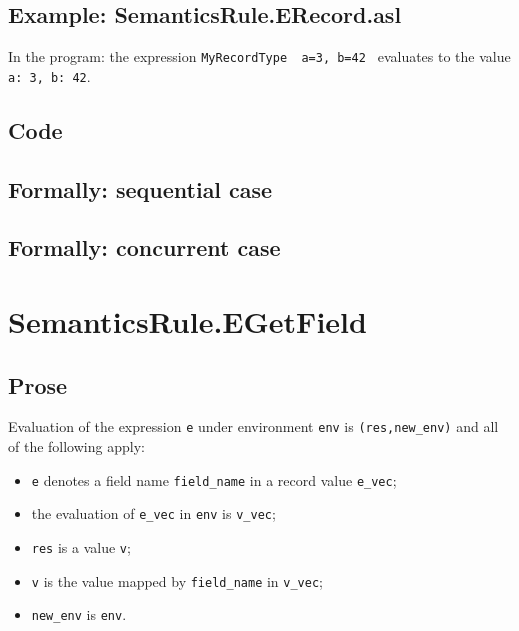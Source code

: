 \documentclass{book}
\begin{document}
  \subsection{Example: SemanticsRule.ERecord.asl}
    In the program:
    the expression \texttt{MyRecordType { a=3, b=42 }} evaluates to the value \texttt{{a:
3, b: 42}}.

  \subsection{Code}

\begin{emptyformal}
  \subsection{Formally: sequential case}

  \subsection{Formally: concurrent case}
\end{emptyformal}


\section{SemanticsRule.EGetField \label{sec:SemanticsRule.EGetField}}

  \subsection{Prose}
  Evaluation of the expression \texttt{e} under environment \texttt{env} is
  \texttt{(res,new\_env)} and all of the following apply:
  \begin{itemize}
  \item \texttt{e} denotes a field name \texttt{field\_name} in a record value \texttt{e\_vec};
  \item the evaluation of \texttt{e\_vec} in \texttt{env} is \texttt{v\_vec};
  \item \texttt{res} is a value \texttt{v};
  \item \texttt{v} is the value mapped by \texttt{field\_name} in \texttt{v\_vec};
  \item \texttt{new\_env} is \texttt{env}.
  \end{itemize}
\end{document}
